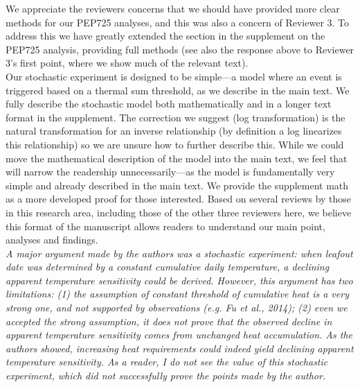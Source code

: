 \documentclass[11pt,letter]{article}
\begin{document}
We appreciate the reviewers concerns that we should have provided more clear methods for our PEP725 analyses, and this was also a concern of Reviewer 3. To address this we have greatly extended the section in the supplement on the PEP725 analysis, providing full methods (see also the response above to Reviewer 3's first point, where we show much of the relevant text). \\

Our stochastic experiment is designed to be simple---a model where an event is triggered based on a thermal sum threshold, as we describe in the main text. We fully describe the stochastic model both mathematically and in a longer text format in the supplement. The correction we suggest (log transformation) is the natural transformation for an inverse relationship (by definition a log linearizes this relationship) so we are unsure how to further describe this. While we could move the mathematical description of the model into the main text, we feel that will narrow the readership unnecessarily---as the model is fundamentally very simple and already described in the main text. We provide the supplement math as a more developed proof for those interested. Based on several reviews by those in this research area, including those of the other three reviewers here, we believe this format of the manuscript allows readers to understand our main point, analyses and findings.\\

\emph{A major argument made by the authors was a stochastic experiment: when leafout date was determined by a constant cumulative daily temperature, a declining apparent temperature sensitivity could be derived. However, this argument has two limitations: (1) the assumption of constant threshold of cumulative heat is a very strong one, and not supported by observations (e.g. Fu et al., 2014); (2) even we accepted the strong assumption, it does not prove that the observed decline in apparent temperature sensitivity comes from unchanged heat accumulation. As the authors showed, increasing heat requirements could indeed yield declining apparent temperature sensitivity. As a reader, I do not see the value of this stochastic experiment, which did not successfully prove the points made by the author. }\\
\end{document}
